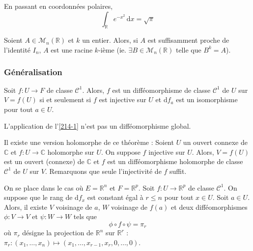 
  \begin{example}
    En passant en coordonnées polaires,
    \[ \int_{\mathbb{R}} e^{-x^2} \, \mathrm{d}x = \sqrt{\pi} \]
  \end{example}


  \begin{application}
    Soient $A \in \mathcal{M}_n(\mathbb{R})$ et $k$ un entier. Alors, si $A$ est suffisamment proche de l'identité $I_n$, $A$ est une racine $k$-ième (ie. $\exists B \in \mathcal{M}_n(\mathbb{R})$ telle que $B^k = A$).
  \end{application}

  \subsubsection{Généralisation}


  \begin{theorem}
    Soit $f : U \rightarrow F$ de classe $\mathcal{C}^1$. Alors, $f$ est un difféomorphisme de classe $\mathcal{C}^1$ de $U$ sur $V = f(U)$ si et seulement si $f$ est injective sur $U$ et $\mathrm{d}f_a$ est un isomorphisme pour tout $a \in U$.
  \end{theorem}


  \begin{example}
    L'application de l'\cref{214-1} n'est pas un difféomorphisme global.
  \end{example}


  \begin{remark}
    Il existe une version holomorphe de ce théorème :
    \newpar
    Soient $U$ un ouvert connexe de $\mathbb{C}$ et $f : U \rightarrow \mathbb{C}$ holomorphe sur $U$. On suppose $f$ injective sur $U$. Alors, $V = f(U)$ est un ouvert (connexe) de $\mathbb{C}$ et $f$ est un difféomorphisme holomorphe de classe $\mathcal{C}^1$ de $U$ sur $V$.
    \newpar
    Remarquons que seule l'injectivité de $f$ suffit.
  \end{remark}


  \begin{theorem}
    On se place dans le cas où $E = \mathbb{R}^n$ et $F = \mathbb{R}^p$. Soit $f : U \rightarrow \mathbb{R}^p$ de classe $\mathcal{C}^1$. On suppose que le rang de $\mathrm{d}f_x$ est constant égal à $r \leq n$ pour tout $x \in U$. Soit $a \in U$. Alors, il existe $V$ voisinage de $a$, $W$ voisinage de $f(a)$ et deux difféomorphismes $\phi : V \rightarrow V$ et $\psi : W \rightarrow W$ tels que
    \[ \phi \circ f \circ \psi = \pi_r \]
    où $\pi_r$ désigne la projection de $\mathbb{R}^n$ sur $\mathbb{R}^r$ : $\pi_r : (x_1, \dots, x_n) \mapsto (x_1, \dots, x_{r-1}, x_r, 0, \dots, 0)$.
  \end{theorem}

